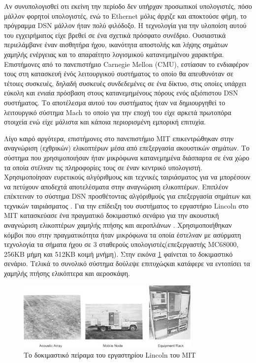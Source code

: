 Αν συνυπολογισθεί οτι εκείνη την περίοδο δεν υπήρχαν προσωπικοί υπολογιστές, πόσο μάλλον φορητοί υπολογιστές, ενώ το Ethernet μόλις άρχιζε και αποκτούσε φήμη, το
πρόγραμμα DSN μάλλον ήταν πολύ φιλόδοξο.
Η τεχνολογία για την υλοποίση αυτού του εγχειρήματος είχε βρεθεί σε ένα σχετικά πρόσφατο συνέδριο\cite{1978DSN}.
Ουσιαστικά περιελάμβανε έναν αισθητήρα ήχου, ικανότητα αποστολής και λήψης σημάτων χαμηλής ενέργειας και το απαραίτητο λογισμικού κατανεμημένου χαρακτήρα.
Επιστήμονες από το πανεπιστήμιο Carnegie Mellon (CMU), εστίασαν το ενδιαφέρον τους στη κατασκευή ένός λειτουργικού συστήματος το οποίο θα απευθυνόταν σε τέτοιες
συσκευές, δηλαδή συσκευές συνδεδεμένες σε ένα δίκτυο, στις οποίες υπάρχει εύκολη και ενιαία πρόσβαση στους κατανεμημένους πόρους ενός αξιόπιστου DSN συστήματος.
Το αποτέλεσμα αυτού του συστήματος ήταν να δημιουργηθεί το λειτουργικό σύστημα Mach το οποίο για την εποχή του είχε αρκετά πρωτοπόρα στοιχεία \cite{Mach} ενώ είχε
μάλιστα και κάποια περιορισμένη εμπορική επιτυχία.

Λίγο καιρό αργότερα, επιστήμονες στο πανεπιστήμιο MIT επικεντρώθηκαν στην αναγνώριση (εχθρικών) ελικοπτέρων μέσα από επεξεργασία ακουστικών σημάτων.
Το σύστημα που χρησιμοποιήσαν ήταν μικρόφωνα κατανεμημένα διάσπαρτα σε ένα χώρο τα οποία στέλναν τις πληροφορίες τους σε έναν κεντρικό υπολογιστή.
Χρησιμοποίησαν ευρετικούς αλγόριθμους και τεχνικές ταιριάσματος για να μπορέσουν να πετύχουν αποδεχτά αποτελέσματα στην αναγνώριση ελικοπτέρων.
Επιπλέον επέκτειναν το σύστημα DSN προσθέτοντας αλγόριθμούς για επεξεργασία σημάτων και τεχνικών ταιριάσματος \cite{4789229}.
Για την επίδειξη του συστήματος το εργαστήριο Lincoln στο MIT κατασκεύασε ένα πραγματικό δοκιμαστικό σενάριο για την ακουστική αναγνώριση ελικοπτέρων χαμηλής πτήσης
και αεροπλάνων \cite{aircraft}.
Χρησιμοποιήθηκαν κόμβοι που στην πραγματικότητα ήταν μικρόφωνα τα οποία έστελναν με ασύρματη τεχνολογία τα σήματα ήχου σε 3 σταθερούς υπολογιστές(επεξεργαστής
MC68000, 256KB μήμη και 512ΚΒ κοιμή μνήμη).
Στην εικόνα \ref{fig:lincoln_lab} \cite{lincoln_report} φαίνεται το δοκιμαστικό σενάριο.
Τελικά το συνολικό σύστημα δούλεψε επιτυχώςκαι κατάφερε να εντοπίσει τα χαμηλής πτήσης ελικόπτερα και αεροσκάφη.
\begin{figure}[h]
	\centering
	\includegraphics[width=0.8\textwidth]{images/lincoln_lab.eps}
	\caption{Tο δοκιμαστικό πείραμα του εργαστηρίου Lincoln του MIT}
	\label{fig:lincoln_lab}
\end{figure}

